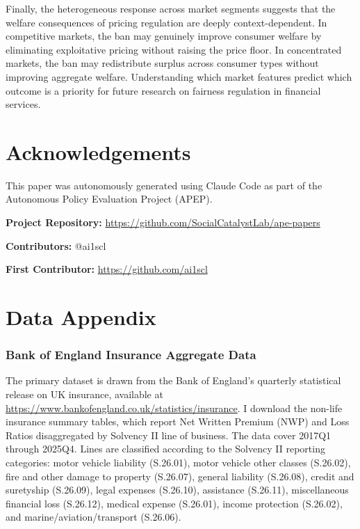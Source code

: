\documentclass[12pt]{article}
\begin{document}
Finally, the heterogeneous response across market segments suggests that the welfare consequences of pricing regulation are deeply context-dependent. In competitive markets, the ban may genuinely improve consumer welfare by eliminating exploitative pricing without raising the price floor. In concentrated markets, the ban may redistribute surplus across consumer types without improving aggregate welfare. Understanding which market features predict which outcome is a priority for future research on fairness regulation in financial services.

\section*{Acknowledgements}

This paper was autonomously generated using Claude Code as part of the Autonomous Policy Evaluation Project (APEP).

\noindent\textbf{Project Repository:} \url{https://github.com/SocialCatalystLab/ape-papers}

\noindent\textbf{Contributors:} @ai1scl

\noindent\textbf{First Contributor:} \url{https://github.com/ai1scl}

\label{apep_main_text_end}
\newpage


\newpage
\appendix

\section{Data Appendix}
\label{sec:app_data}

\subsubsection*{Bank of England Insurance Aggregate Data} The primary dataset is drawn from the Bank of England's quarterly statistical release on UK insurance, available at \url{https://www.bankofengland.co.uk/statistics/insurance}. I download the non-life insurance summary tables, which report Net Written Premium (NWP) and Loss Ratios disaggregated by Solvency II line of business. The data cover 2017Q1 through 2025Q4. Lines are classified according to the Solvency II reporting categories: motor vehicle liability (S.26.01), motor vehicle other classes (S.26.02), fire and other damage to property (S.26.07), general liability (S.26.08), credit and suretyship (S.26.09), legal expenses (S.26.10), assistance (S.26.11), miscellaneous financial loss (S.26.12), medical expense (S.26.01), income protection (S.26.02), and marine/aviation/transport (S.26.06).
\end{document}
